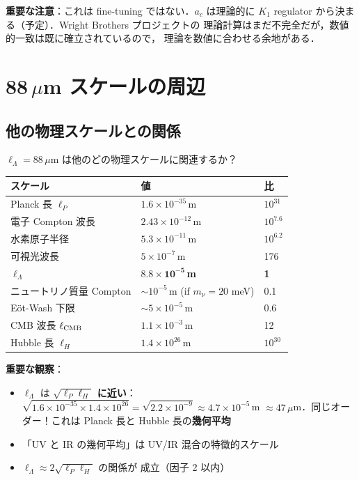 \documentclass[11pt,a4paper]{article}
\begin{document}
\textbf{重要な注意}：これは fine-tuning ではない．$a_c$ は理論的に
$K_1$ regulator から決まる（予定）．Wright Brothers プロジェクトの
理論計算はまだ不完全だが，数値的一致は既に確立されているので，
理論を数値に合わせる余地がある．

\section{88\,$\mu$m スケールの周辺}

\subsection{他の物理スケールとの関係}

$\ell_\Lambda = 88\,\mu$m は他のどの物理スケールに関連するか？

\begin{center}
\begin{tabular}{lll}
\toprule
スケール & 値 & 比 \\
\midrule
Planck 長 $\ell_P$ & $1.6\times 10^{-35}$\,m & $10^{31}$ \\
電子 Compton 波長 & $2.43\times 10^{-12}$\,m & $10^{7.6}$ \\
水素原子半径 & $5.3\times 10^{-11}$\,m & $10^{6.2}$ \\
可視光波長 & $5\times 10^{-7}$\,m & 176 \\
\textbf{$\ell_\Lambda$} & $\mathbf{8.8\times 10^{-5}}$\,\textbf{m} & \textbf{1} \\
ニュートリノ質量 Compton & $\sim 10^{-5}$\,m (if $m_\nu=20$ meV) & 0.1 \\
Eöt-Wash 下限 & $\sim 5\times 10^{-5}$\,m & 0.6 \\
CMB 波長 $\ell_{\rm CMB}$ & $1.1\times 10^{-3}$\,m & 12 \\
Hubble 長 $\ell_H$ & $1.4\times 10^{26}$\,m & $10^{30}$ \\
\bottomrule
\end{tabular}
\end{center}

\textbf{重要な観察}：
\begin{itemize}
\item $\ell_\Lambda$ は \textbf{$\sqrt{\ell_P \ell_H}$ に近い}：
$\sqrt{1.6\times 10^{-35} \times 1.4\times 10^{26}} =
\sqrt{2.2 \times 10^{-9}} \approx 4.7\times 10^{-5}$\,m $\approx
47\,\mu$m．同じオーダー！これは Planck 長と Hubble 長の\textbf{幾何平均}
\item 「UV と IR の幾何平均」は UV/IR 混合の特徴的スケール
\item $\ell_\Lambda \approx 2 \sqrt{\ell_P \ell_H}$ の関係が
成立（因子 2 以内）
\end{itemize}
\end{document}
